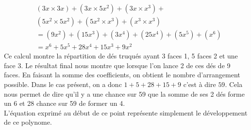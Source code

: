 \documentclass[letterpaper]{article}
\begin{document}
    \begin{align*}
     &(3x \times 3x) + (3x \times 5x^2) + (3x \times x^3) +\\
     &(5x^2 \times 5x^2) + (5x^2 \times x^3) + (x^3 \times x^3)\\
     &= (9x^2) + (15x^3) + (3x^4) + (25x^4) + (5x^5) + (x^6)\\
     &= x^6 + 5x^5 + 28x^4 + 15x^3 + 9x^2
    \end{align*}
    Ce calcul montre la répartition de dés truqués ayant 3 faces 1, 5 faces 2 et une face 3.
    Le résultat final nous montre que lorsque l'on lance 2 de ces dés de 9 faces. En faisant
    la somme des coefficients, on obtient le nombre d'arrangement possible.  Dans le cas
    présent, on a donc $1 + 5 + 28 + 15 + 9$ c'est à dire $59$.  Cela nous permet de dire
    qu'il y a une chance sur 59 que la somme de ses 2 dés forme un 6 et 28 chance sur 59
    de former un 4.\\
    L'équation exprimé au début de ce point représente simplement le développement de 
    ce polynome.
    
\end{document}
